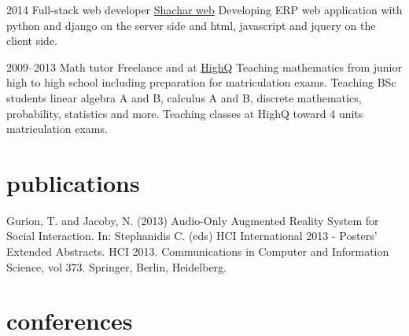 \documentclass[]{friggeri-cv}
\begin{document}
\begin{entrylist}

    \entry
    {2014}
    {Full-stack web developer}
    {\href{http://www.shachar-web.co.il/}{Shachar web}}
    {
      Developing ERP web application with python and django on the server side and html, javascript and jquery on the client side.
    }

\end{entrylist}
\begin{entrylist}

    \entry
    {2009--2013}
    {Math tutor}
    {Freelance and at \href{http://high-q.co.il/}{HighQ}}
    {
      Teaching mathematics from junior high to high school including preparation for matriculation exams.
      Teaching BSc students linear algebra A and B, calculus A and B, discrete mathematics, probability, statistics and more.
      Teaching classes at HighQ toward 4 units matriculation exams.
    }

\end{entrylist}



\section{publications}

Gurion, T. and Jacoby, N. (2013) Audio-Only Augmented Reality System for Social Interaction. In: Stephanidis C. (eds) HCI International 2013 - Posters’ Extended Abstracts. HCI 2013. Communications in Computer and Information Science, vol 373. Springer, Berlin, Heidelberg.



\section{conferences}
\end{document}
